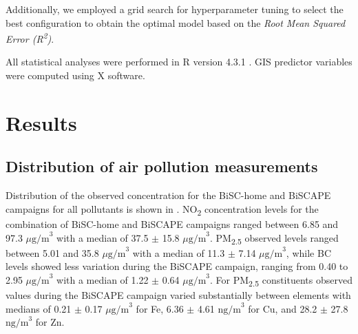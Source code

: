 \documentclass{article}
\begin{document}
Additionally, we employed a grid search for hyperparameter tuning to select the best configuration to obtain the optimal model based on the \textit{Root Mean Squared Error (R\textsuperscript{2})}. 

All statistical analyses were performed in R version 4.3.1 \cite{Rstudio}. GIS predictor variables were computed using X software. 

\section{Results}

\subsection{Distribution of air pollution measurements}

Distribution of the observed concentration for the BiSC-home and BiSCAPE campaigns for all pollutants is shown in . NO\textsubscript{2} concentration levels for the combination of BiSC-home and BiSCAPE campaigns ranged between 6.85 and 97.3 \(\mu \text{g/m}^3\) with a median of  37.5 \(\pm\) 15.8 \( \mu \text{g/m}^3\). PM\textsubscript{2.5} observed levels ranged between 5.01 and 35.8 \( \mu \text{g/m}^3\) with a median of 11.3 \(\pm\) 7.14 \(\mu \text{g/m}^3\), while BC levels showed less variation during the BiSCAPE campaign, ranging from 0.40 to 2.95 \(  \mu \text{g/m}^3\) with a median of 1.22 \(\pm\) 0.64 \( \mu \text{g/m}^3\). For PM\textsubscript{2.5} constituents  observed values during the BiSCAPE campaign varied substantially between elements with medians of 0.21 \(\pm\) 0.17 \(  \mu \text{g/m}^3\)  for  Fe,  6.36 \(\pm\) 4.61 \( \text{ng/m}^3 \) for Cu, and 28.2 \(\pm\) 27.8 \( \text{ng/m}^3 \) for Zn. 
\end{document}
